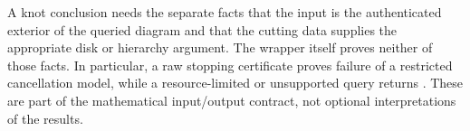 A knot conclusion needs the separate facts that the input is the authenticated
exterior of the queried diagram and that the cutting data supplies the
appropriate disk or hierarchy argument. The wrapper itself proves neither
of those facts. In particular, a raw stopping certificate proves failure
of a restricted cancellation model, while a resource-limited or unsupported
query returns . These are part of the mathematical
input/output contract, not optional interpretations of the results.
